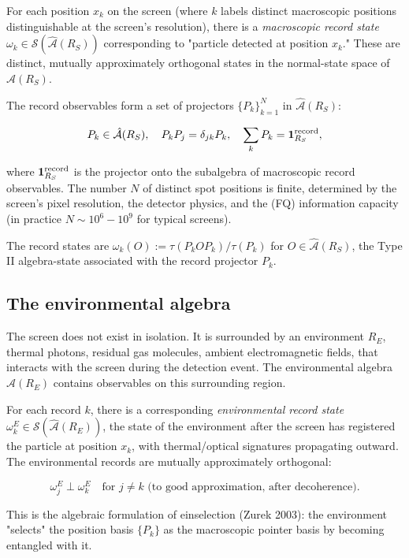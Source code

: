 \documentclass[11pt,a4paper]{article}
\begin{document}
For each position $x_k$ on the screen (where $k$ labels distinct macroscopic positions distinguishable at the screen's resolution), there is a \emph{macroscopic record state} $\omega_k \in \mathcal{S}(\hat{\mathcal{A}}(R_S))$ corresponding to "particle detected at position $x_k$." These are distinct, mutually approximately orthogonal states in the normal-state space of $\hat{\mathcal{A}}(R_S)$.

The record observables form a set of projectors $\{P_k\}_{k=1}^N$ in $\hat{\mathcal{A}}(R_S)$:

\[
P_k \in \hat{\mathcal{A}}(R_S), \quad P_k P_j = \delta_{jk} P_k, \quad \sum_k P_k = \mathbf{1}_{R_S}^{\rm record},
\]

where $\mathbf{1}_{R_S}^{\rm record}$ is the projector onto the subalgebra of macroscopic record observables. The number $N$ of distinct spot positions is finite, determined by the screen's pixel resolution, the detector physics, and the (FQ) information capacity (in practice $N \sim 10^6 - 10^9$ for typical screens).

The record states are $\omega_k(O) := \tau(P_k O P_k) / \tau(P_k)$ for $O \in \hat{\mathcal{A}}(R_S)$, the Type II algebra-state associated with the record projector $P_k$.

\subsection{The environmental algebra}

The screen does not exist in isolation. It is surrounded by an environment $R_E$, thermal photons, residual gas molecules, ambient electromagnetic fields, that interacts with the screen during the detection event. The environmental algebra $\hat{\mathcal{A}}(R_E)$ contains observables on this surrounding region.

For each record $k$, there is a corresponding \emph{environmental record state} $\omega_k^E \in \mathcal{S}(\hat{\mathcal{A}}(R_E))$, the state of the environment after the screen has registered the particle at position $x_k$, with thermal/optical signatures propagating outward. The environmental records are mutually approximately orthogonal:

\[
\omega_j^E \perp \omega_k^E \quad \text{for } j \ne k \text{ (to good approximation, after decoherence)}.
\]

This is the algebraic formulation of einselection (Zurek 2003): the environment "selects" the position basis $\{P_k\}$ as the macroscopic pointer basis by becoming entangled with it.
\end{document}
